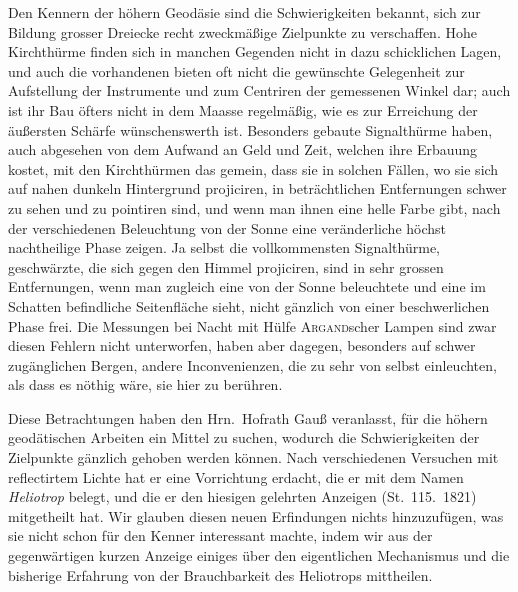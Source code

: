 \documentclass[12pt,a4paper]{article}
\theoremstyle{plain}
\theoremstyle{definition}
\theoremstyle{remark}
\begin{document}
Den Kennern der h\"ohern Geod\"asie sind die Schwierigkeiten bekannt, sich zur Bildung grosser Dreiecke recht zweckm\"a\ss ige Zielpunkte zu verschaffen. Hohe Kirchth\"urme finden sich in manchen Gegenden nicht in dazu schicklichen Lagen, und auch die vorhandenen bieten oft nicht die gew\"unschte Gelegenheit zur Aufstellung der Instrumente und zum Centriren der gemessenen Winkel dar; auch ist ihr Bau \"ofters nicht in dem Maasse regelm\"a\ss ig, wie es zur Erreichung der \"au\ss ersten Sch\"arfe w\"unschenswerth ist. Besonders gebaute Signalth\"urme haben, auch abgesehen von dem Aufwand an Geld und Zeit, welchen ihre Erbauung kostet, mit den Kirchth\"urmen das gemein, dass sie in solchen F\"allen, wo sie sich auf nahen dunkeln Hintergrund projiciren, in betr\"achtlichen Entfernungen schwer zu sehen und zu pointiren sind, und wenn man ihnen eine helle Farbe gibt, nach der verschiedenen Beleuchtung von der Sonne eine ver\"anderliche h\"ochst nachtheilige Phase zeigen. Ja selbst die vollkommensten Signalth\"urme, geschw\"arzte, die sich gegen den Himmel projiciren, sind in sehr grossen Entfernungen, wenn man zugleich eine von der Sonne beleuchtete und eine im Schatten befindliche Seitenfl\"ache sieht, nicht g\"anzlich von einer beschwerlichen Phase frei. Die Messungen bei Nacht mit H\"ulfe \textsc{Argand}scher Lampen sind zwar diesen Fehlern nicht unterworfen, haben aber dagegen, besonders auf schwer zug\"anglichen Bergen, andere Inconvenienzen, die zu sehr von selbst einleuchten, als dass es n\"othig w\"are, sie hier zu ber\"uhren.

Diese Betrachtungen haben den Hrn.\ Hofrath Gau\ss{} veranlasst, f\"ur die h\"ohern geod\"atischen Arbeiten ein Mittel zu suchen, wodurch die Schwierigkeiten der Zielpunkte g\"anzlich gehoben werden k\"onnen. Nach verschiedenen Versuchen mit reflectirtem Lichte hat er eine Vorrichtung erdacht, die er mit dem Namen \emph{Heliotrop} belegt, und die er den hiesigen gelehrten Anzeigen (St.\ 115.\ 1821) mitgetheilt hat. Wir glauben diesen neuen Erfindungen nichts hinzuzuf\"ugen, was sie nicht schon f\"ur den Kenner interessant machte, indem wir aus der gegenw\"artigen kurzen Anzeige einiges \"uber den eigentlichen Mechanismus und die bisherige Erfahrung von der Brauchbarkeit des Heliotrops mittheilen.
\end{document}
